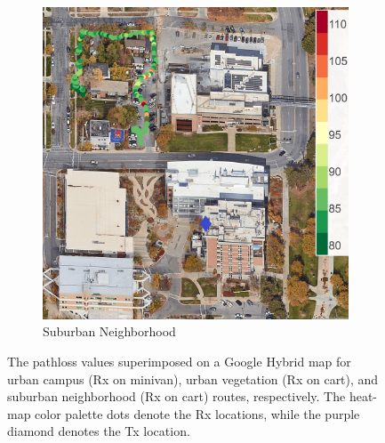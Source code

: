 \documentclass[12pt, draftcls, onecolumn]{IEEEtran}
\begin{document}
\begin{figure} [t]
\begin{subfigure}{0.245\linewidth}
         \centering
         \includegraphics[width=1.0\linewidth]{figs/pl_suburban_fraternities.jpg}
         \caption{Suburban Neighborhood}
         \label{F6c}
     \end{subfigure}
     \vspace{-2mm}
     \caption{The pathloss values superimposed on a Google Hybrid map for urban campus (Rx on minivan), urban vegetation (Rx on cart), and suburban neighborhood (Rx on cart) routes, respectively. The heat-map color palette dots denote the Rx locations, while the purple diamond denotes the Tx location.}
     \label{F6}
\end{figure}
\end{document}
